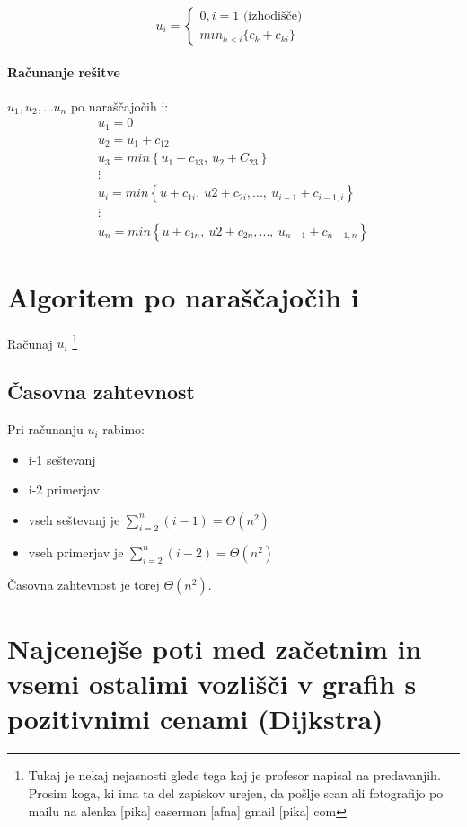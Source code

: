 \documentclass[a4paper,10pt]{article}
\begin{document}
\begin{equation}
u_i = \left \{
\begin{array}{l}
	0, i = 1 \mbox{ (izhodi\v s\v ce) } \\
	min_{k<i} \lbrace c_k + c_{ki} \rbrace
\end{array}
\right.
\end{equation}

\paragraph{Ra\v cunanje re\v sitve} $u_1, u_2,... u_n$ po nara\v s\v cajo\v cih i:
$$
\begin{array}{l}
u_1 = 0 \\
u_2 = u_1 + c_{12} \\
u_3 = min \left\lbrace u_1 + c_{13},\: u_2 + C_{23} \right\rbrace \\
\vdots \\
u_i = min \left\lbrace u + c_{1i},\: u2 + c_{2i},...,\: u_{i-1} + c_{i-1,i} \right\rbrace \\
\vdots \\
u_n = min \left\lbrace u + c_{1n},\: u2 + c_{2n},...,\: u_{n-1} + c_{n-1,n} \right\rbrace 
\end{array}
$$

\section{Algoritem po nara\v s\v cajo\v cih i}
Ra\v cunaj $u_i$ \footnote{Tukaj je nekaj nejasnosti glede tega kaj je profesor napisal na predavanjih. Prosim koga, ki ima ta del zapiskov urejen, da po\v slje scan ali fotografijo po mailu na alenka [pika] caserman [afna] gmail [pika] com}

\subsection{\v Casovna zahtevnost}
Pri ra\v cunanju $u_i$ rabimo:
\begin{itemize}
\item i-1 se\v stevanj
\item i-2 primerjav
\item vseh se\v stevanj je $\sum_{i=2}^n (i-1) = \Theta (n^2)$
\item vseh primerjav je $\sum_{i=2}^n (i-2) = \Theta (n^2)$
\end{itemize}
\v Casovna zahtevnost je torej $\Theta (n^2)$.

\section{Najcenej\v se poti med za\v cetnim in vsemi ostalimi vozli\v s\v ci v grafih s pozitivnimi cenami (Dijkstra)}
\end{document}
